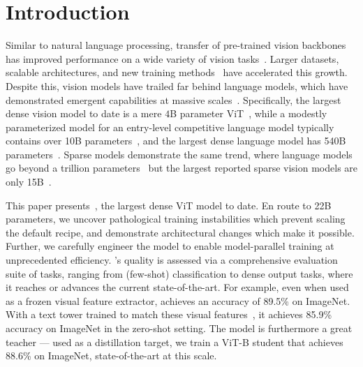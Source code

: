 \section{Introduction}
Similar to natural language processing, transfer of pre-trained vision backbones has improved performance on a wide variety of vision tasks~\citep{pan2009survey,zhai2019large,kolesnikov2020big}.
Larger datasets, scalable architectures, and new training methods~\citep{mahajan2018exploring,dosovitskiy2020image,clip,zhai2022scaling} have accelerated this growth. Despite this, vision models have trailed far behind language models, which have demonstrated emergent capabilities at massive scales~\citep{chowdhery2022palm, wei2022emergent}. Specifically, the largest dense vision model to date is a mere $4$B parameter ViT~\citep{chen2022pali}, while a modestly parameterized model for an entry-level competitive language model typically contains over 10B parameters~\citep{t5paper,tay2022unifying,chung2022scaling}, and the largest dense language model has 540B parameters~\citep{chowdhery2022palm}. Sparse models demonstrate the same trend, where language models go beyond a trillion parameters~\citep{fedus2021switch} but the largest reported sparse vision models are only 15B~\citep{riquelme2021scaling}.


This paper presents~\chonk{}, the largest dense ViT model to date. En route to 22B parameters, we uncover pathological training instabilities which prevent scaling the default recipe, and demonstrate architectural changes which make it possible. Further, we carefully engineer the model to enable model-parallel training at unprecedented efficiency.
\chonk{}'s quality is assessed via a comprehensive evaluation suite of tasks, ranging from (few-shot) classification to dense output tasks, where it reaches or advances the current state-of-the-art.
For example, even when used as a frozen visual feature extractor, \chonk achieves an accuracy of 89.5\% on ImageNet.
With a text tower trained to match these visual features~\citep{lit}, it achieves 85.9\% accuracy on ImageNet in the zero-shot setting.
The model is furthermore a great teacher --- used as a distillation target, we train a ViT-B student that achieves 88.6\% on ImageNet, state-of-the-art at this scale.

